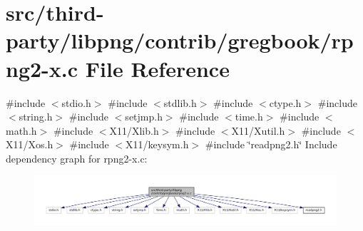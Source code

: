 \hypertarget{rpng2-x_8c}{}\section{src/third-\/party/libpng/contrib/gregbook/rpng2-\/x.c File Reference}
\label{rpng2-x_8c}
{\ttfamily \#include $<$stdio.\+h$>$}\newline
{\ttfamily \#include $<$stdlib.\+h$>$}\newline
{\ttfamily \#include $<$ctype.\+h$>$}\newline
{\ttfamily \#include $<$string.\+h$>$}\newline
{\ttfamily \#include $<$setjmp.\+h$>$}\newline
{\ttfamily \#include $<$time.\+h$>$}\newline
{\ttfamily \#include $<$math.\+h$>$}\newline
{\ttfamily \#include $<$X11/\+Xlib.\+h$>$}\newline
{\ttfamily \#include $<$X11/\+Xutil.\+h$>$}\newline
{\ttfamily \#include $<$X11/\+Xos.\+h$>$}\newline
{\ttfamily \#include $<$X11/keysym.\+h$>$}\newline
{\ttfamily \#include \char`\"{}readpng2.\+h\char`\"{}}\newline
Include dependency graph for rpng2-\/x.c\+:
\nopagebreak
\begin{figure}[H]
\begin{center}
\leavevmode
\includegraphics[width=350pt]{rpng2-x_8c__incl}
\end{center}
\end{figure}
